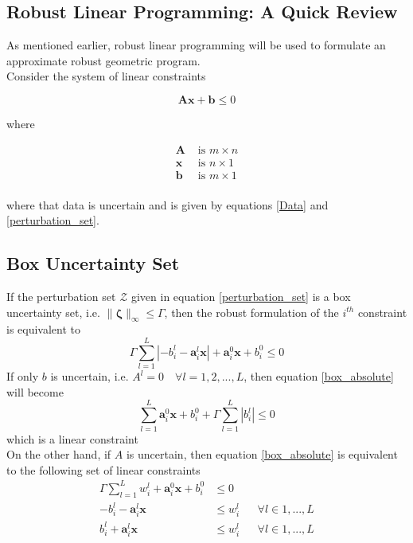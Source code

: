 \documentclass{article}
\renewcommand{\vec}{\mathbf}
\newcommand{\mat}{\mathbf}
\begin{document}
{\begin{appendices}

\section{Robust Linear Programming: A Quick Review}

As mentioned earlier, robust linear programming will be used to formulate an approximate robust geometric program.\\[12pt]
Consider the system of linear constraints

\begin{equation*}
    \mat{A}\vec{x} + \vec{b} \leq 0
\end{equation*}

where

\begin{equation*}
\begin{aligned}
\mat{A} &\text{ is $m \times n$}\\
\vec{x} &\text{ is $n \times 1$}\\
\vec{b} &\text{ is $m \times 1$}\\
\end{aligned}
\end{equation*}

where that data is uncertain and is given by equations \eqref{Data} and \eqref{perturbation_set}.

\subsection{Box Uncertainty Set}
If the perturbation set $\mathcal{Z}$ given in equation \eqref{perturbation_set} is a box uncertainty set, i.e. $\|\vec{\zeta}\|_{\infty} \leq \Gamma$, then the robust formulation of the $i^{th}$ constraint is equivalent to
\begin{equation}
\Gamma \textstyle{\sum}_{l=1}^L |- {b}^l_{i} - \vec{a}^l_i\vec{x}| + \vec{a}^0_i\vec{x} + b^0_i \leq 0
\label{box_absolute}
\end{equation}
If only $b$ is uncertain, i.e. $A^l = 0 \quad \forall l = 1,2,...,L$, then equation \eqref{box_absolute} will become
\begin{equation}
\textstyle{\sum}_{l=1}^L \vec{a}^0_{i}\vec{x} + b^0_{i} + \Gamma \textstyle{\sum}_{l=1}^L |b^l_{i}| \leq 0
\label{box_coeff}
\end{equation}
which is a linear constraint\\
On the other hand, if $A$ is uncertain, then equation \eqref{box_absolute} is equivalent to the following set of linear constraints
\begin{equation}
\begin{aligned}
\Gamma \textstyle{\sum}_{l=1}^L w^l_{i} + \vec{a}^0_{i}\vec{x} + b^0_{i} &\leq 0\\
- b^l_{i} - \vec{a}^l_{i}\vec{x} &\leq w^l_{i} &&\forall l \in 1,...,L\\
b^l_{i} + \vec{a}^l_{i}\vec{x} &\leq w^l_{i} &&\forall l \in 1,...,L\\
\end{aligned}
\label{box_linear}
\end{equation}


\end{appendices}}
\end{document}
